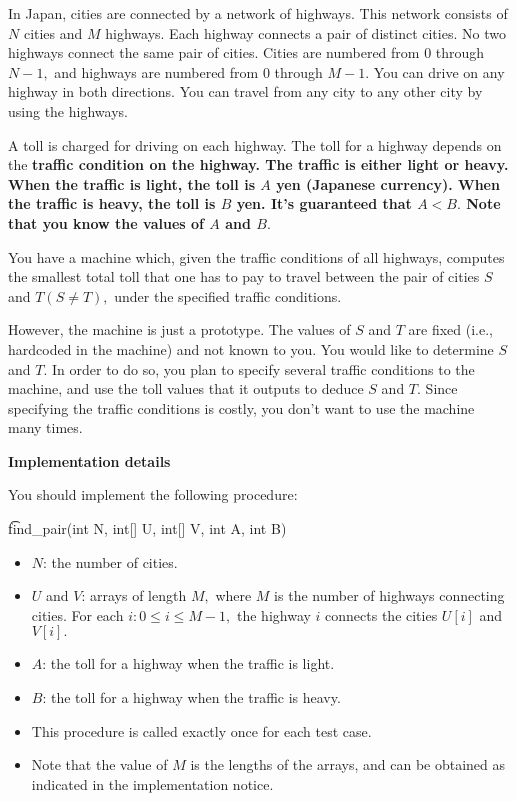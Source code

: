 In Japan, cities are connected by a network of highways. This network consists of $N$ cities and $M$ highways. Each highway connects a pair of distinct cities. No two highways connect the same pair of cities. Cities are numbered from $0$ through $N-1,$ and highways are numbered from $0$ through $M-1.$ You can drive on any highway in both directions. You can travel from any city to any other city by using the highways.

A toll is charged for driving on each highway. The toll for a highway depends on the \bf{traffic} condition on the highway. The traffic is either \bf{light} or \bf{heavy}. When the traffic is light, the toll is $A$ yen (Japanese currency). When the traffic is heavy, the toll is $B$ yen. It's guaranteed that $A < B.$ Note that you know the values of $A$ and $B.$

You have a machine which, given the traffic conditions of all highways, computes the smallest total toll that one has to pay to travel between the pair of cities $S$ and $T (S \neq T),$ under the specified traffic conditions.

However, the machine is just a prototype. The values of $S$ and $T$ are fixed (i.e., hardcoded in the machine) and not known to you. You would like to determine $S$ and $T.$ In order to do so, you plan to specify several traffic conditions to the machine, and use the toll values that it outputs to deduce $S$ and $T.$ Since specifying the traffic conditions is costly, you don't want to use the machine many times.

\bf{Implementation details}

You should implement the following procedure:

\t{find_pair(int N, int[] U, int[] V, int A, int B)}

\begin{itemize}
\item $N$: the number of cities. 
\item $U$ and $V$: arrays of length $M,$ where $M$ is the number of highways connecting cities. For each $i : 0 \le i \le M-1,$ the highway $i$ connects the cities $U[i]$ and $V[i].$ 
\item $A$: the toll for a highway when the traffic is light. 
\item $B$: the toll for a highway when the traffic is heavy. 
\item This procedure is called exactly once for each test case. 
\item Note that the value of $M$ is the lengths of the arrays, and can be obtained as indicated in the implementation notice.
\end{itemize}

